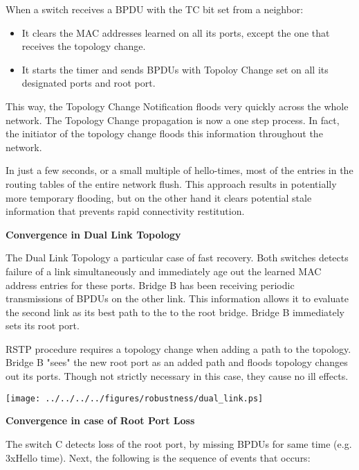 When a switch receives a BPDU with the TC bit set from a neighbor:

\begin{itemize}
 
	\item It clears the MAC addresses learned on all its ports, except the 
one that receives the topology change. 
	\item It starts the timer and sends BPDUs with Topoloy Change set on all
 its designated ports and root port.
\end{itemize}

This way, the Topology Change Notification floods very quickly across the whole 
network. The Topology Change propagation is now a one step process. In fact, the
initiator of the topology change floods this information throughout the network.

In just a few seconds, or a small multiple of hello-times, most of the entries 
in the routing tables of the entire network flush. This approach results in
potentially more temporary flooding, but on the other hand it clears potential
stale information that prevents rapid connectivity restitution. 



\textbf{Convergence in Dual Link Topology}

The Dual Link Topology a particular case of fast recovery. Both switches detects
 failure of a link  simultaneously and immediately age out the learned MAC
address entries for these ports. Bridge B has been receiving periodic
transmissions of BPDUs on the other link. This information allows it to evaluate
the second link as its best path to the to the root bridge. Bridge B immediately
sets its root port. 

RSTP procedure requires a topology change when adding a path to the topology. 
Bridge B "sees" the new root port as an added path and floods topology changes
out its ports. Though not strictly necessary in this case, they cause no ill
effects.

\begin{center}
        \texttt{[image: ../../../../figures/robustness/dual\_link.ps]}
        \label{fig:idual_link}
\end{center}

\textbf{Convergence in case of Root Port Loss}

The switch C  detects loss of the root port, by missing BPDUs for same time 
(e.g. 3xHello time). Next, the following is the sequence of events that occurs:

